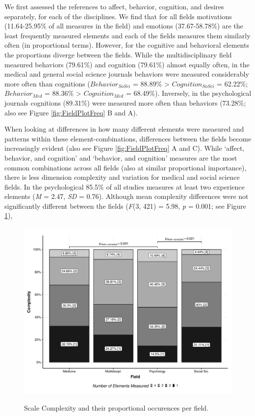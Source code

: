 We first assessed the references to affect, behavior, cognition, and
desires separately, for each of the disciplines. We find that for all
fields motivations (11.64-25.95\% of all measures in the field) and
emotions (37.67-58.78\%) are the least frequently measured elements and
each of the fields measures them similarly often (in proportional
terms). However, for the cognitive and behavioral elements the
proportions diverge between the fields. While the multidisciplinary
field measured behaviors (79.61\%) and cognition (79.61\%) almost
equally often, in the medical and general social science journals
behaviors were measured considerably more often than cognitions
(\(Behavior_{SoSci}\) = 88.89\% \textgreater{} \(Cognition_{SoSci}\) =
62.22\%; \(Behavior_{Med}\) = 88.36\% \textgreater{} \(Cognition_{Med}\)
= 68.49\%). Inversely, in the psychological journals cognitions
(89.31\%) were measured more often than behaviors (73.28\%; also see
Figure \ref{fig:FieldPlotFreq} B and A).

When looking at differences in how many different elements were measured
and patterns within these element-combinations, differences between the
fields become increasingly evident (also see Figure
\ref{fig:FieldPlotFreq} A and C). While `affect, behavior, and
cognition' and `behavior, and cognition' measures are the most common
combinations across all fields (also at similar proportional
importance), there is less dimension complexity and variation for
medical and social science fields. In the psychological 85.5\% of all
studies measures at least two experience elements (\textit{M} = 2.47,
\textit{SD} = 0.76). Although mean complexity differences were not
significantly different between the fields (\textit{F}(3, 421) = 5.98,
\textit{p} = 0.001; see Figure \ref{fig:FieldPlotComplexityAverage}),

\begin{figure}[h]
\centering
\caption{Scale Complexity and their proportional occurences per field.}
\includegraphics[width=\textwidth]{Figures/FieldPlotComplexityAverage-1}
\label{fig:FieldPlotComplexityAverage}
\end{figure}

